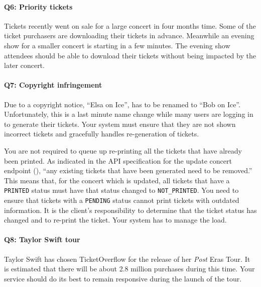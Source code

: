 \documentclass{csse4400}
\begin{document}
\paragraph{Q6: Priority tickets}
Tickets recently went on sale for a large concert in four months time.
Some of the ticket purchasers are downloading their tickets in advance.
Meanwhile an evening show for a smaller concert is starting in a few minutes.
The evening show attendees should be able to download their tickets without being impacted by the later concert.

\paragraph{Q7: Copyright infringement}
Due to a copyright notice, ``Elsa on Ice'', has to be renamed to ``Bob on Ice''.
Unfortunately, this is a last minute name change while many users are logging in to generate their tickets.
Your system must ensure that they are not shown incorrect tickets and gracefully handles re-generation of tickets.

You are not required to queue up re-printing all the tickets that have already been printed.
As indicated in the API specification for the update concert endpoint
(),
``any existing tickets that have been generated need to be removed.''
This means that, for the concert which is updated, all tickets that have a \texttt{PRINTED}
status must have that status changed to \texttt{NOT\_PRINTED}.
You need to ensure that tickets with a \texttt{PENDING} status cannot print tickets with outdated information.
It is the client's responsibility to determine that the ticket status has changed and to re-print the ticket.
Your system has to manage the load.

\paragraph{Q8: Taylor Swift tour}
Taylor Swift has chosen TicketOverflow for the release of her \textit{Post} Eras Tour.
It is estimated that there will be about 2.8 million purchases during this time.
Your service should do its best to remain responsive during the launch of the tour.
\end{document}
